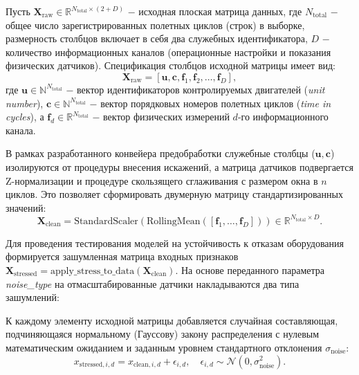 \documentclass[14pt, a4paper, oneside]{extreport}
\begin{document}
Пусть $\mathbf{X}_{\text{raw}} \in \mathbb{R}^{N_{\text{total}} \times (2 + D)}$ $-$ исходная плоская матрица данных, где $N_{\text{total}}$ $-$ общее число зарегистрированных полетных циклов (строк) в выборке, размерность столбцов включает в себя два служебных идентификатора, $D$ $-$ количество информационных каналов (операционные настройки и показания физических датчиков). Спецификация столбцов исходной матрицы имеет вид:
\begin{equation}
\mathbf{X}_{\text{raw}} = \left[ \mathbf{u}, \mathbf{c}, \mathbf{f}_1, \mathbf{f}_2, \dots, \mathbf{f}_D \right],
\end{equation}
где $\mathbf{u} \in \mathbb{N}^{N_{\text{total}}}$ $-$ вектор идентификаторов контролируемых двигателей (\textit{unit number}), $\mathbf{c} \in \mathbb{N}^{N_{\text{total}}}$ $-$ вектор порядковых номеров полетных циклов (\textit{time in cycles}), а $\mathbf{f}_d \in \mathbb{R}^{N_{\text{total}}}$ $-$ вектор физических измерений $d$-го информационного канала.

В рамках разработанного конвейера предобработки служебные столбцы ($\mathbf{u}, \mathbf{c}$) изолируются от процедуры внесения искажений, а матрица датчиков подвергается Z-нормализации и процедуре скользящего сглаживания с размером окна в $n$ циклов. Это позволяет сформировать двумерную матрицу стандартизированных значений:
\begin{equation}
\mathbf{X}_{\text{clean}} = \text{StandardScaler}\left( \text{RollingMean}\left( \left[ \mathbf{f}_1, \dots, \mathbf{f}_D \right] \right) \right) \in \mathbb{R}^{N_{\text{total}} \times D}.
\end{equation}

Для проведения тестирования моделей на устойчивость к отказам оборудования формируется зашумленная матрица входных признаков $\mathbf{X}_{\text{stressed}} = \text{apply\_stress\_to\_data}(\mathbf{X}_{\text{clean}})$. На основе переданного параметра \textit{noise\_type} на отмасштабированные датчики накладываются два типа зашумлений:

К каждому элементу исходной матрицы добавляется случайная составляющая, подчиняющаяся нормальному (Гауссову) закону распределения с нулевым математическим ожиданием и заданным уровнем стандартного отклонения $\sigma_{\text{noise}}$:
\begin{equation}
x_{\text{stressed}, i, d} = x_{\text{clean}, i, d} + \epsilon_{i, d}, \quad \epsilon_{i, d} \sim \mathcal{N}(0, \sigma_{\text{noise}}^2).
\end{equation}
\end{document}
